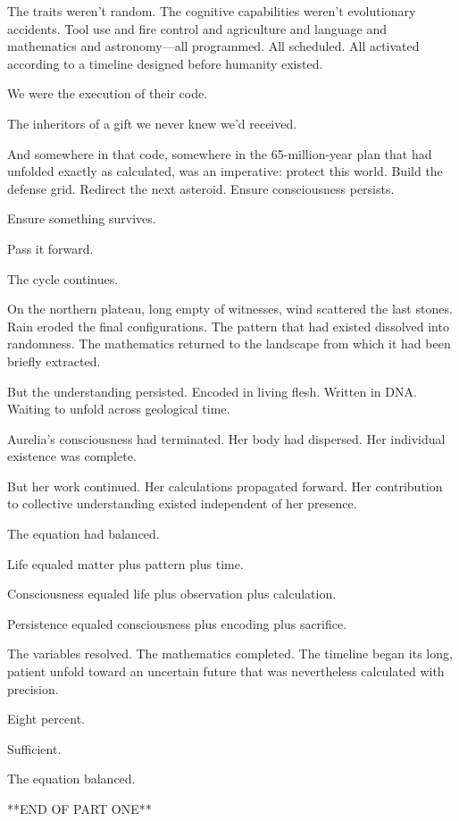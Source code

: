 The traits weren't random. The cognitive capabilities weren't evolutionary accidents. Tool use and fire control and agriculture and language and mathematics and astronomy—all programmed. All scheduled. All activated according to a timeline designed before humanity existed.

We were the execution of their code.

The inheritors of a gift we never knew we'd received.

And somewhere in that code, somewhere in the 65-million-year plan that had unfolded exactly as calculated, was an imperative: protect this world. Build the defense grid. Redirect the next asteroid. Ensure consciousness persists.

Ensure something survives.

Pass it forward.

The cycle continues.

\scenebreak

On the northern plateau, long empty of witnesses, wind scattered the last stones. Rain eroded the final configurations. The pattern that had existed dissolved into randomness. The mathematics returned to the landscape from which it had been briefly extracted.

But the understanding persisted. Encoded in living flesh. Written in DNA. Waiting to unfold across geological time.

Aurelia's consciousness had terminated. Her body had dispersed. Her individual existence was complete.

But her work continued. Her calculations propagated forward. Her contribution to collective understanding existed independent of her presence.

The equation had balanced.

Life equaled matter plus pattern plus time.

Consciousness equaled life plus observation plus calculation.

Persistence equaled consciousness plus encoding plus sacrifice.

The variables resolved. The mathematics completed. The timeline began its long, patient unfold toward an uncertain future that was nevertheless calculated with precision.

Eight percent.

Sufficient.

The equation balanced.

\scenebreak

**END OF PART ONE**

